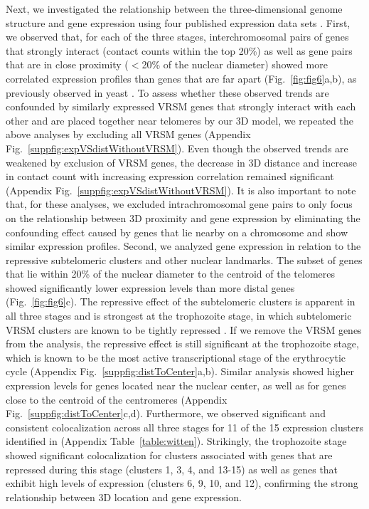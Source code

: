 Next, we investigated the relationship between the three-dimensional genome
structure and gene expression using four published expression data sets
\citep{leroch:discovery, lopez-barragan:directional, otto:new,
bunnik:polysome}. First, we observed that, for each of the three stages,
interchromosomal pairs of genes that strongly interact (contact counts within
the top 20\%) as well as gene pairs that are in close proximity ($<$20\% of
the nuclear diameter) showed more correlated expression profiles than genes
that are far apart (Fig.~\ref{fig:fig6}a,b), as previously observed in yeast
\citep{homouz:3d}. To assess whether these observed trends are confounded by
similarly expressed VRSM genes that strongly interact with each other and are
placed together near telomeres by our 3D model, we repeated the above analyses
by excluding all VRSM genes (Appendix
Fig.~\ref{suppfig:expVSdistWithoutVRSM}). Even though the observed trends are
weakened by exclusion of VRSM genes, the decrease in 3D distance and increase
in contact count with increasing expression correlation remained significant
(Appendix Fig.~\ref{suppfig:expVSdistWithoutVRSM}). It is also important
to note that, for these analyses, we excluded intrachromosomal gene pairs to
only focus on the relationship between 3D proximity and gene expression by
eliminating the confounding effect caused by genes that lie nearby on a
chromosome and show similar expression profiles. Second, we analyzed gene
expression in relation to the repressive subtelomeric clusters
\citep{duraisingh:heterochromatin, dzikowski:mechanisms,
lopez-rubio:genome-wide} and other nuclear landmarks. The subset of genes that
lie within 20\% of the nuclear diameter to the centroid of the telomeres
showed significantly lower expression levels than more distal genes
(Fig.~\ref{fig:fig6}c). The repressive effect of the subtelomeric clusters is
apparent in all three stages and is strongest at the trophozoite stage, in
which subtelomeric VRSM clusters are known to be tightly repressed
\citep{chen:developmental}. If we remove the VRSM genes from the analysis, the
repressive effect is still significant at the trophozoite stage, which is
known to be the most active transcriptional stage of the erythrocytic cycle
(Appendix Fig.~\ref{suppfig:distToCenter}a,b). Similar analysis showed
higher expression levels for genes located near the nuclear center, as well as
for genes close to the centroid of the centromeres (Appendix
Fig.~\ref{suppfig:distToCenter}c,d). Furthermore, we observed significant and
consistent colocalization across all three stages for 11 of the 15 expression
clusters identified in \cite{leroch:discovery} (Appendix
Table~\ref{table:witten}). Strikingly, the trophozoite stage showed
significant colocalization for clusters associated with genes that are
repressed during this stage (clusters 1, 3, 4, and 13-15) as well as genes
that exhibit high levels of expression (clusters 6, 9, 10, and 12), confirming
the strong relationship between 3D location and gene expression.


